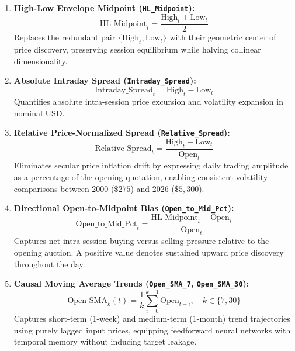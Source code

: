 \documentclass[conference]{IEEEtran}
\begin{document}
\begin{enumerate}
    \item \textbf{High-Low Envelope Midpoint (\texttt{HL\_Midpoint}):}
    \begin{equation}
        \text{HL\_Midpoint}_t = \frac{\text{High}_t + \text{Low}_t}{2}
    \end{equation}
    Replaces the redundant pair $\{\text{High}_t, \text{Low}_t\}$ with their geometric center of price discovery, preserving session equilibrium while halving collinear dimensionality.
    
    \item \textbf{Absolute Intraday Spread (\texttt{Intraday\_Spread}):}
    \begin{equation}
        \text{Intraday\_Spread}_t = \text{High}_t - \text{Low}_t
    \end{equation}
    Quantifies absolute intra-session price excursion and volatility expansion in nominal USD.
    
    \item \textbf{Relative Price-Normalized Spread (\texttt{Relative\_Spread}):}
    \begin{equation}
        \text{Relative\_Spread}_t = \frac{\text{High}_t - \text{Low}_t}{\text{Open}_t}
    \end{equation}
    Eliminates secular price inflation drift by expressing daily trading amplitude as a percentage of the opening quotation, enabling consistent volatility comparisons between 2000 ($\$275$) and 2026 ($\$5{,}300$).
    
    \item \textbf{Directional Open-to-Midpoint Bias (\texttt{Open\_to\_Mid\_Pct}):}
    \begin{equation}
        \text{Open\_to\_Mid\_Pct}_t = \frac{\text{HL\_Midpoint}_t - \text{Open}_t}{\text{Open}_t}
    \end{equation}
    Captures net intra-session buying versus selling pressure relative to the opening auction. A positive value denotes sustained upward price discovery throughout the day.
    
    \item \textbf{Causal Moving Average Trends (\texttt{Open\_SMA\_7}, \texttt{Open\_SMA\_30}):}
    \begin{equation}
        \text{Open\_SMA}_k(t) = \frac{1}{k} \sum_{i=0}^{k-1} \text{Open}_{t-i}, \quad k \in \{7, 30\}
    \end{equation}
    Captures short-term (1-week) and medium-term (1-month) trend trajectories using purely lagged input prices, equipping feedforward neural networks with temporal memory without inducing target leakage.
    

\end{enumerate}
\end{document}
